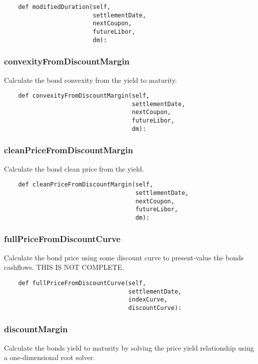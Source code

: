 \documentclass[twoside,11pt]{book}
\begin{document}
\begin{lstlisting}
    def modifiedDuration(self,
                         settlementDate,
                         nextCoupon,
                         futureLibor,
                         dm):
\end{lstlisting}

\subsubsection*{{\bf convexityFromDiscountMargin}}
Calculate the bond convexity from the yield to maturity.  

\begin{lstlisting}
    def convexityFromDiscountMargin(self,
                                    settlementDate,
                                    nextCoupon,
                                    futureLibor,
                                    dm):
\end{lstlisting}

\subsubsection*{{\bf cleanPriceFromDiscountMargin}}
Calculate the bond clean price from the yield.  

\begin{lstlisting}
    def cleanPriceFromDiscountMargin(self,
                                     settlementDate,
                                     nextCoupon,
                                     futureLibor,
                                     dm):
\end{lstlisting}

\subsubsection*{{\bf fullPriceFromDiscountCurve}}
Calculate the bond price using some discount curve to present-value the bonds cashflows. THIS IS NOT COMPLETE.  

\begin{lstlisting}
    def fullPriceFromDiscountCurve(self,
                                   settlementDate,
                                   indexCurve,
                                   discountCurve):
\end{lstlisting}

\subsubsection*{{\bf discountMargin}}
Calculate the bonds yield to maturity by solving the price yield relationship using a one-dimensional root solver.  
\end{document}

